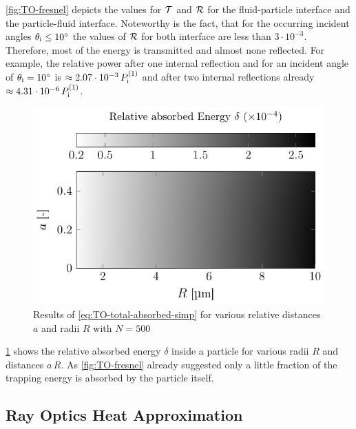 \cref{fig:TO-fresnel} depicts the values for $\mathcal{T}$ and $\mathcal{R}$ for 
the fluid-particle interface and the particle-fluid interface. Noteworthy is 
the fact, that for the occurring incident angles $\theta_{\mathrm{i}} \leq 
\SI{10}{\degree}$ the values of $\mathcal{R}$ for both interface are less than 
$3\cdot 10^{-3}$. Therefore, most of the energy is transmitted and almost none 
reflected. For example, the relative power after one internal reflection and 
for an incident angle of $\theta_{\mathrm{i}}=\SI{10}{\degree}$ is $\approx 2.07\cdot 
10^{-3}\,P_{\mathrm{i}}^{(1)}$ and after two internal reflections already $\approx 
4.31\cdot 10^{-6}\,P_{\mathrm{i}}^{(1)}$.

\begin{figure}[tbp]
  \centering
  \includegraphics[]{Plots/cache/absorbed_energies.pdf}
  \caption{Results of \cref{eq:TO-total-absorbed-simp} for various relative 
  distances $a$ and radii $R$ with $N=500$ }
  \label{fig:TO-absorbed_energies}
\end{figure}

\cref{fig:TO-absorbed_energies} shows the relative absorbed energy $\delta$ 
inside a particle for various radii $R$ and distances $a\,R$. As 
\cref{fig:TO-fresnel} already suggested only a little fraction of the trapping 
energy is absorbed by the particle itself.

\subsection{Ray Optics Heat Approximation}

